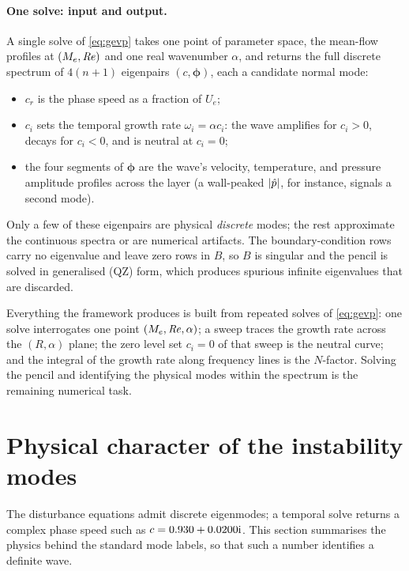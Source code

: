 \documentclass[11pt]{article}
\begin{document}
\paragraph{One solve: input and output.} A single solve of \eqref{eq:gevp} takes one point of
parameter space, the mean-flow profiles at $(M_e,\mathit{Re})$ and one real wavenumber $\alpha$, and
returns the full discrete spectrum of $4(n{+}1)$ eigenpairs $(c,\boldsymbol\phi)$, each a candidate
normal mode:
\begin{itemize}[nosep,leftmargin=1.6em]
  \item $c_r$ is the phase speed as a fraction of $U_e$;
  \item $c_i$ sets the temporal growth rate $\omega_i=\alpha c_i$: the wave amplifies for $c_i>0$,
        decays for $c_i<0$, and is neutral at $c_i=0$;
  \item the four segments of $\boldsymbol\phi$ are the wave's velocity, temperature, and pressure
        amplitude profiles across the layer (a wall-peaked $|\hat{p}|$, for instance, signals a second
        mode).
\end{itemize}
Only a few of these eigenpairs are physical \emph{discrete} modes; the rest approximate the continuous
spectra or are numerical artifacts. The boundary-condition rows carry no eigenvalue and leave zero
rows in $B$, so $B$ is singular and the pencil is solved in generalised (QZ) form, which produces
spurious infinite eigenvalues that are discarded.

Everything the framework produces is built from repeated solves of \eqref{eq:gevp}: one solve
interrogates one point $(M_e,\mathit{Re},\alpha)$; a sweep traces the growth rate across the $(R,\alpha)$
plane; the zero level set $c_i=0$ of that sweep is the neutral curve; and the integral of the growth
rate along frequency lines is the $N$-factor. Solving the pencil and identifying the physical modes
within the spectrum is the remaining numerical task.

\section{Physical character of the instability modes}\label{sec:mechanisms}
The disturbance equations admit discrete eigenmodes; a temporal solve returns a complex phase speed
such as $c=0.930+0.0200\mathrm{i}$. This section summarises the physics behind the standard mode labels, so
that such a number identifies a definite wave.
\end{document}
